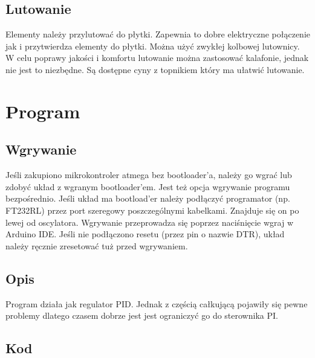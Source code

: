 \documentclass[a4paper,11pt]{article}
\begin{document}
\subsection{Lutowanie}
Elementy należy przylutować do płytki. Zapewnia to dobre elektryczne połączenie jak i przytwierdza elementy do płytki. Można użyć zwykłej kolbowej lutownicy. W celu poprawy jakości i komfortu lutowanie można zastosować kalafonie, jednak nie jest to niezbędne. Są dostępne cyny z topnikiem który ma ułatwić lutowanie.

\section{Program}
\subsection{Wgrywanie}
Jeśli zakupiono mikrokontroler atmega bez bootloader'a, należy go wgrać lub zdobyć układ z wgranym bootloader'em.
Jest też opcja wgrywanie programu bezpośrednio.
Jeśli układ ma bootload'er należy podłączyć programator (np. FT232RL) przez port szeregowy poszczególnymi kabelkami. Znajduje się on po lewej od oscylatora. Wgrywanie przeprowadza się poprzez naciśnięcie wgraj w Arduino IDE. Jeśli nie podłączono resetu (przez pin o nazwie DTR), układ należy ręcznie zresetować tuż przed wgrywaniem.

\subsection{Opis}
Program działa jak regulator PID. Jednak z częścią całkującą pojawiły się pewne problemy dlatego czasem dobrze jest jest ograniczyć go do sterownika PI.

\subsection{Kod}

\end{document}
